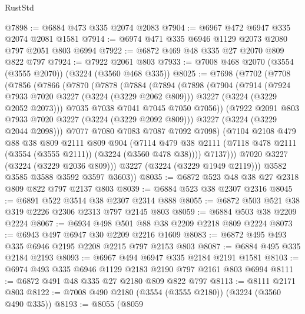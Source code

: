 \begin{lexlean}{RustStd}
\begin{coremodule}
@7898 := @6884 @473 @335 @2074 @2083
@7904 := @6967 @472 @6947 @335 @2074 @2081 @1581
@7914 := @6974 @471 @335 @6946 @1129 @2073 @2080 @797 @2051 @803 @6994
@7922 := @6872 @469 @48 @335 @27 @2070 @809 @822 @797
@7924 := @7922 @2061 @803
@7933 := @7008 @468 @2070 (@3554 (@3555 @2070)) (@3224 (@3560 @468 @335))
@8025 := @7698
    (@7702
      (@7708
        (@7856
          (@7866
            (@7870
              (@7878
                (@7884
                  (@7894
                    (@7898
                      (@7904
                        (@7914
                          (@7924 @7933 @7020 @3227 (@3224 (@3229 @2062 @809)))
                          @3227
                          (@3224 (@3229 @2052 @2073)))
                        @7035
                        @7038
                        @7041
                        @7045
                        @7050
                        @7056))
                    (@7922 @2091 @803 @7933 @7020 @3227 (@3224 (@3229 @2092 @809)))
                    @3227
                    (@3224 (@3229 @2044 @2098)))
                  @7077
                  @7080
                  @7083
                  @7087
                  @7092
                  @7098)
                (@7104
                  @2108
                  @479
                  @88
                  @38
                  @809
                  @2111
                  @809
                  @904
                  (@7114
                    @479
                    @38
                    @2111
                    (@7118 @478 @2111 (@3554 (@3555 @2111)) (@3224 (@3560 @478 @38))))
                  @7137)))
            @7020
            @3227
            (@3224 (@3229 @2036 @809)))
          @3227
          (@3224 (@3229 @1949 @2119)))
        @3582
        @3585
        @3588
        @3592
        @3597
        @3603))
@8035 := @6872 @523 @48 @38 @27 @2318 @809 @822 @797 @2137 @803
@8039 := @6884 @523 @38 @2307 @2316
@8045 := @6891 @522 @3514 @38 @2307 @2314 @888
@8055 := @6872 @503 @521 @38 @319 @2226 @2306 @2313 @797 @2145 @803
@8059 := @6884 @503 @38 @2209 @2224
@8067 := @6934 @498 @501 @88 @38 @2209 @2218 @809 @2224
@8073 := @6943 @497 @6947 @30 @2209 @2216 @1609
@8083 := @6872 @495 @493 @335 @6946 @2195 @2208 @2215 @797 @2153 @803
@8087 := @6884 @495 @335 @2184 @2193
@8093 := @6967 @494 @6947 @335 @2184 @2191 @1581
@8103 := @6974 @493 @335 @6946 @1129 @2183 @2190 @797 @2161 @803 @6994
@8111 := @6872 @491 @48 @335 @27 @2180 @809 @822 @797
@8113 := @8111 @2171 @803
@8122 := @7008 @490 @2180 (@3554 (@3555 @2180)) (@3224 (@3560 @490 @335))
@8193 := @8055
    (@8059

\end{coremodule}
\end{lexlean}
